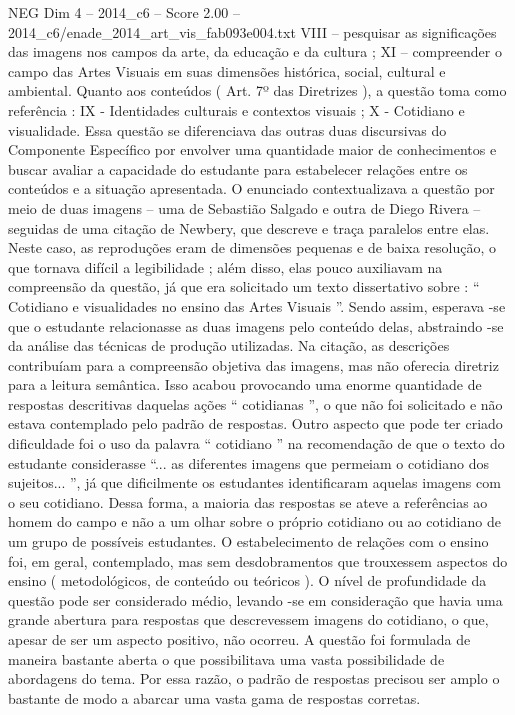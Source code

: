 \begin{textsample}{NEG Dim 4 – 2014\_c6 – Score 2.00 – 2014\_c6/enade\_2014\_art\_vis\_fab093e004.txt}
VIII – pesquisar as significações das imagens nos campos da arte, da educação e da cultura ; XI – compreender o campo das Artes Visuais em suas dimensões histórica, social, cultural e ambiental.
Quanto aos conteúdos ( Art. 7º das Diretrizes ), a questão toma como referência : IX - Identidades culturais e contextos visuais ; X - Cotidiano e visualidade.
Essa questão se diferenciava das outras duas discursivas do Componente Específico por envolver uma quantidade maior de conhecimentos e buscar avaliar a capacidade do estudante para estabelecer relações entre os conteúdos e a situação apresentada.
O enunciado contextualizava a questão por meio de duas imagens – uma de Sebastião Salgado e outra de Diego Rivera – seguidas de uma citação de Newbery, que descreve e traça paralelos entre elas.
Neste caso, as reproduções eram de dimensões pequenas e de baixa resolução, o que tornava difícil a legibilidade ; além disso, elas pouco auxiliavam na compreensão da questão, já que era solicitado um texto dissertativo sobre : “ Cotidiano e visualidades no ensino das Artes Visuais ”.
Sendo assim, esperava -se que o estudante relacionasse as duas imagens pelo conteúdo delas, abstraindo -se da análise das técnicas de produção utilizadas.
Na citação, as descrições contribuíam para a compreensão objetiva das imagens, mas não oferecia diretriz para a leitura semântica.
Isso acabou provocando uma enorme quantidade de respostas descritivas daquelas ações “ cotidianas ”, o que não foi solicitado e não estava contemplado pelo padrão de respostas.
Outro aspecto que pode ter criado dificuldade foi o uso da palavra “ cotidiano ” na recomendação de que o texto do estudante considerasse “... as diferentes imagens que permeiam o cotidiano dos sujeitos... ”, já que dificilmente os estudantes identificaram aquelas imagens com o seu cotidiano.
Dessa forma, a maioria das respostas se ateve a referências ao homem do campo e não a um olhar sobre o próprio cotidiano ou ao cotidiano de um grupo de possíveis estudantes.
O estabelecimento de relações com o ensino foi, em geral, contemplado, mas sem desdobramentos que trouxessem aspectos do ensino ( metodológicos, de conteúdo ou teóricos ).
O nível de profundidade da questão pode ser considerado médio, levando -se em consideração que havia uma grande abertura para respostas que descrevessem imagens do cotidiano, o que, apesar de ser um aspecto positivo, não ocorreu.
A questão foi formulada de maneira bastante aberta o que possibilitava uma vasta possibilidade de abordagens do tema.
Por essa razão, o padrão de respostas precisou ser amplo o bastante de modo a abarcar uma vasta gama de respostas corretas.

\end{textsample}
